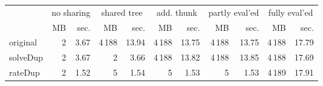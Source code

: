 \makeatletter
\begin{tabular}{lrrrrrrrrrr}
 \\
& \multicolumn{2}{c}{no sharing}& \multicolumn{2}{c}{shared tree}& \multicolumn{2}{c}{add. thunk}& \multicolumn{2}{c}{partly eval'ed}& \multicolumn{2}{c}{fully eval'ed} \\
& MB & sec.& MB & sec.& MB & sec.& MB & sec.& MB & sec. \\ \midrule 
original& {\def\@currentlabel{2}\label{stats:Original:Unshared:mem}2} & {\def\@currentlabel{3.67}\label{stats:Original:Unshared:time}3.67}& {\def\@currentlabel{4\,188}\label{stats:Original:Shared:mem}4\,188} & {\def\@currentlabel{13.94}\label{stats:Original:Shared:time}13.94}& {\def\@currentlabel{4\,188}\label{stats:Original:SharedThunk:mem}4\,188} & {\def\@currentlabel{13.75}\label{stats:Original:SharedThunk:time}13.75}& {\def\@currentlabel{4\,188}\label{stats:Original:SharedEvaled:mem}4\,188} & {\def\@currentlabel{13.75}\label{stats:Original:SharedEvaled:time}13.75}& {\def\@currentlabel{4\,188}\label{stats:Original:SharedFull:mem}4\,188} & {\def\@currentlabel{17.79}\label{stats:Original:SharedFull:time}17.79} \\
\textsf{solveDup}& {\def\@currentlabel{2}\label{stats:SolveDup:Unshared:mem}2} & {\def\@currentlabel{3.67}\label{stats:SolveDup:Unshared:time}3.67}& {\def\@currentlabel{2}\label{stats:SolveDup:Shared:mem}2} & {\def\@currentlabel{3.66}\label{stats:SolveDup:Shared:time}3.66}& {\def\@currentlabel{4\,188}\label{stats:SolveDup:SharedThunk:mem}4\,188} & {\def\@currentlabel{13.82}\label{stats:SolveDup:SharedThunk:time}13.82}& {\def\@currentlabel{4\,188}\label{stats:SolveDup:SharedEvaled:mem}4\,188} & {\def\@currentlabel{13.85}\label{stats:SolveDup:SharedEvaled:time}13.85}& {\def\@currentlabel{4\,188}\label{stats:SolveDup:SharedFull:mem}4\,188} & {\def\@currentlabel{17.69}\label{stats:SolveDup:SharedFull:time}17.69} \\
\textsf{rateDup}& {\def\@currentlabel{2}\label{stats:RateDup:Unshared:mem}2} & {\def\@currentlabel{1.52}\label{stats:RateDup:Unshared:time}1.52}& {\def\@currentlabel{5}\label{stats:RateDup:Shared:mem}5} & {\def\@currentlabel{1.54}\label{stats:RateDup:Shared:time}1.54}& {\def\@currentlabel{5}\label{stats:RateDup:SharedThunk:mem}5} & {\def\@currentlabel{1.53}\label{stats:RateDup:SharedThunk:time}1.53}& {\def\@currentlabel{5}\label{stats:RateDup:SharedEvaled:mem}5} & {\def\@currentlabel{1.53}\label{stats:RateDup:SharedEvaled:time}1.53}& {\def\@currentlabel{4\,189}\label{stats:RateDup:SharedFull:mem}4\,189} & {\def\@currentlabel{17.91}\label{stats:RateDup:SharedFull:time}17.91} \\

\end{tabular}
